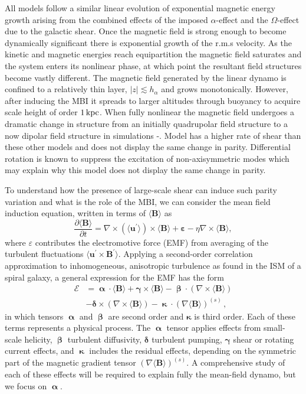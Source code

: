 \documentclass[fleqn,usenatbib]{mnras}
\newcommand{\RSOBSA}{{\sf{O60}}}
\newcommand{\RSOBSB}{{\sf{O60q0.7}}}
\newcommand{\RSOBSE}{{\sf{O60q0.1}}}
\newcommand\aver[1]{\langle#1\rangle}%
\newcommand\deriv[2]{\frac{\partial#1}{\partial#2}}%
\renewcommand\vec[1]{\bm{#1}}%
\newcommand{\BB}{\vec{B}} %
\newcommand{\uu}{\vec{u}^\prime} %
\newcommand{\kpc}{\,{\rm kpc}}  %
\begin{document}
All models follow a similar linear evolution of exponential magnetic energy
growth arising from the combined effects of the imposed $\alpha$-effect and the
$\Omega$-effect due to the galactic shear. Once the magnetic field is strong
enough to become dynamically significant there is exponential growth of the
r.m.s velocity. As the kinetic and magnetic energies reach equipartition the
magnetic field saturates and the system enters its nonlinear phase, at which
point the resultant field structures become vastly different. The magnetic
field generated by the linear dynamo is confined to a relatively thin layer,
$\lvert z \rvert \lesssim h_{\alpha}$ and grows monotonically. However, after
inducing the MBI it spreads to larger altitudes through buoyancy to acquire
scale height of order $1\kpc$.  When fully nonlinear the magnetic field
undergoes a dramatic change in structure from an initially quadrupolar field
structure to a now dipolar field structure in simulations \RSOBSB-\RSOBSE.
Model {\RSOBSA} has a higher rate of shear than these other models and does not
display the same change in parity. Differential rotation is known to suppress
the excitation of non-axisymmetric modes which may explain why this model does
not display the same change in parity.


To understand how the presence of large-scale shear can induce such parity
variation and what is the role of the MBI, we can consider the mean field
induction equation, written in terms of $\aver{\vec{B}}$  as
\begin{equation}
    \deriv{\aver{\BB}}{t} = \nabla \times (\aver{\uu})\times \aver{\BB} +\vec{\varepsilon} -\eta\nabla\times\aver{\BB},
\end{equation}
where $\varepsilon$ contributes the electromotive force (EMF) from averaging of
the turbulent fluctuations $\aver{\uu\times\BB^\prime}$. Applying a
second-order correlation approximation to inhomogeneous, anisotropic turbulence
as found in the ISM of a spiral galaxy, a general expression for the EMF has
the form
\begin{align}
    \vec{\mathcal{E}} &= \vec{\upalpha}\cdot\aver{\BB} + \vec{\gamma}\times\aver{\BB} - \vec{\upbeta}\cdot\left(\nabla \times \aver{\BB}\right)  \nonumber\\
    &- \vec{\delta}\times(\nabla\times\aver{\BB}) - \vec{\upkappa}\cdot(\nabla\aver{\BB})^{(s)}\,,
\end{align}
in which tensors $\vec{\upalpha}$ and $\vec{\upbeta}$ are second order and
$\vec{\kappa}$ is third order. Each of these terms represents a physical
process. The $\vec{\upalpha}$ tensor applies effects from small-scale helicity,
$\vec{\upbeta}$ turbulent diffusivity, $\vec{\delta}$ turbulent pumping,
$\vec{\gamma}$ shear or rotating current effects, and $\vec{\upkappa}$ includes
the residual effects, depending on the symmetric part of the magnetic gradient
tensor $(\nabla\aver{\BB})^{(s)}$. A comprehensive study of each of these
effects will be required to explain fully the mean-field dynamo, but we focus
on $\vec{\upalpha}$.
\end{document}
